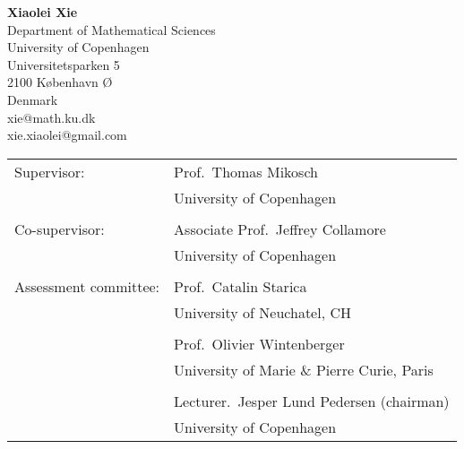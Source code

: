 
\usepackage[numbers,sort&compress]{natbib}

\usepackage{appendix}
\graphicspath{
        {../papers/FX/}{../papers/Jeffrey1/}
        {../papers/DavisMikoschHeinyXie/}
}





\frontmatter


\newpage
\leavevmode\thispagestyle{empty} 

\hspace*{0.5cm}  {\bf Xiaolei Xie}\\
\hspace*{1.5cm} Department of Mathematical Sciences\\
\hspace*{1.5cm} University of Copenhagen\\
\hspace*{1.5cm} Universitetsparken 5\\
\hspace*{1.5cm} 2100 København Ø\\
\hspace*{1.5cm} Denmark\\
\hspace*{1.5cm} xie@math.ku.dk\\
\hspace*{1.5cm} xie.xiaolei@gmail.com

\vspace*{3cm}

\begin{tabular}{ll}
Supervisor: & Prof.~Thomas Mikosch\\
& University of Copenhagen\\
& \\
Co-supervisor: & Associate Prof.~Jeffrey Collamore\\
& University of Copenhagen\\
& \\
Assessment committee: &  Prof.~Catalin Starica\\
& University of Neuchatel, CH\\
& \\

& Prof.~Olivier Wintenberger\\
& University of Marie \& Pierre Curie, Paris\\
& \\

& Lecturer.~Jesper Lund Pedersen (chairman)\\
& University of Copenhagen\\
\end{tabular}

